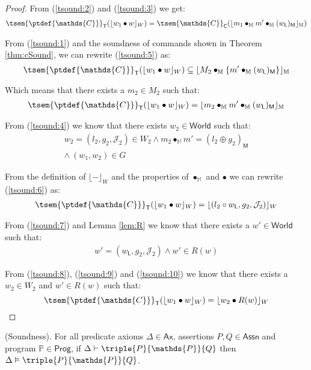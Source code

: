{\begin{proof}
From (\ref{tsound:2}) and (\ref{tsound:3}) we get:
\begin{gather}\label{tsound:5}
\tsem{\ptdef{\mathds{C}}}_\mathsf{T}(\lfloor w_1 \bullet w \rfloor_W) =
\tsem{\mathds{C}}_\mathsf{C}(\lfloor m_1 \bullet_\mathbb{M} m' \bullet_\mathbb{M} (w_\mathsf{L})_\mathsf{M} \rfloor_\mathbb{M})
\end{gather}

From (\ref{tsound:1}) and the soundness of commands shown in Theorem \ref{thm:cSound}, we can rewrite (\ref{tsound:5}) as:
\[
	\tsem{\ptdef{\mathds{C}}}_\mathsf{T}(\lfloor w_1 \bullet w \rfloor_W)
	\subseteq
	\lfloor M_2 \bullet_\mathbb{M} \{m' \bullet_\mathbb{M} (w_\mathsf{L})_\mathsf{M}\} \rfloor_\mathbb{M}
\]

Which means that there exists a $m_2 \in M_2$ such that:
\begin{gather}\label{tsound:6}
	\tsem{\ptdef{\mathds{C}}}_\mathsf{T}(\lfloor w_1 \bullet w \rfloor_W)
	=
	\lfloor m_2 \bullet_\mathbb{M} m' \bullet_\mathbb{M} (w_\mathsf{L})_\mathsf{M} \rfloor_\mathbb{M}
\end{gather}

From (\ref{tsound:4}) we know that there exists $w_2 \in \mathsf{World}$ such that:
\begin{gather}
\label{tsound:8} w_2 = (l_2, g_2, \mathcal{J}_2) \in W_2 \land m_2 \bullet_\mathbb{M} m' = (l_2 \oplus g_2)_\mathsf{M} \\
\label{tsound:7} \land\ (w_1, w_2) \in G
\end{gather}

From the definition of $\lfloor - \rfloor_W$ and the properties of $\bullet_\mathbb{M}$ and $\bullet$ we can rewrite (\ref{tsound:6}) as:
\begin{gather}\label{tsound:9}
	\tsem{\ptdef{\mathds{C}}}_\mathsf{T}(\lfloor w_1 \bullet w \rfloor_W)
	=
	\lfloor (l_2 \circ w_\mathsf{L}, g_2, \mathcal{J}_2) \rfloor_W
\end{gather}

From (\ref{tsound:7}) and Lemma \ref{lem:R} we know that there exists a $w' \in \mathsf{World}$ such that:
\begin{gather}\label{tsound:10}
	w' = (w_\mathsf{L}, g_2, \mathcal{J}_2) \land w' \in R(w)
\end{gather}

From (\ref{tsound:8}), (\ref{tsound:9}) and (\ref{tsound:10}) we know that there exists a $w_2 \in W_2$ and $w' \in R(w)$ such that:
\[
	\tsem{\ptdef{\mathds{C}}}_\mathsf{T}(\lfloor w_1 \bullet w \rfloor_W) = \lfloor w_2 \bullet R(w) \rfloor_W
\]
\end{proof}
}

\begin{thm}
	(Soundness).
	For all predicate axioms $\Delta \in \mathsf{Ax}$, assertions $P, Q \in \mathsf{Assn}$ and program $\mathds{P} \in \mathsf{Prog}$, if $\Delta \vdash \triple{P}{\mathds{P}}{Q}$ then $\Delta \vDash \triple{P}{\mathds{P}}{Q}$.
\end{thm}